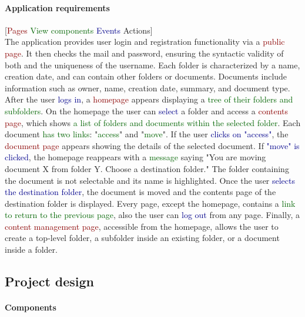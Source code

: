 \documentclass[a4paper,12pt]{article}
\newcommand{\myparagraph}[1]{\paragraph{#1}\mbox{}\\}
\begin{document}
\paragraph{Application requirements}
[\textcolor{darkred}{Pages} \textcolor{darkgreen}{View components} \textcolor{darkblue}{Events} \textcolor{darkyellow}{Actions}]\\
The application provides user \textcolor{darkyellow}{login} and \textcolor{darkyellow}{registration} functionality via a \textcolor{darkred}{public page}. It then \textcolor{darkyellow}{checks the mail and password}, ensuring the syntactic validity of both and the \textcolor{darkyellow}{uniqueness of the username}. Each folder is characterized by a name, creation date, and can contain other folders or documents. Documents include information such as owner, name, creation date, summary, and document type. After the user \textcolor{darkblue}{logs in}, a \textcolor{darkred}{homepage} appears displaying a \textcolor{darkgreen}{tree of their folders and subfolders}.
On the homepage the user can \textcolor{darkblue}{select} a folder and \textcolor{darkyellow}{access} a \textcolor{darkred}{contents page}, which shows \textcolor{darkgreen}{a list of folders and documents within the selected folder}. Each document \textcolor{darkgreen}{has two links}: "\textcolor{darkgreen}{access}" and "\textcolor{darkgreen}{move}". If the user \textcolor{darkblue}{clicks on "access"}, the \textcolor{darkred}{document page} appears showing the details of the selected document. If \textcolor{darkblue}{"move" is clicked}, the homepage reappears with a \textcolor{darkgreen}{message} saying "You are moving document X from folder Y. Choose a destination folder." The folder containing the document is not selectable and its name is highlighted. Once the user \textcolor{darkblue}{selects the destination folder}, \textcolor{darkyellow}{the document is moved} and the contents page of the destination folder is displayed. Every page, except the homepage, contains a \textcolor{darkgreen}{link to return to the previous page}, also the user can \textcolor{darkblue}{log out} from any page. Finally, a \textcolor{darkred}{content management page}, accessible from the homepage, allows the user to \textcolor{darkyellow}{create a top-level folder, a subfolder inside an existing folder, or a document inside a folder}.
\newpage

\subsection{Project design}
\myparagraph{Components}
\end{document}
